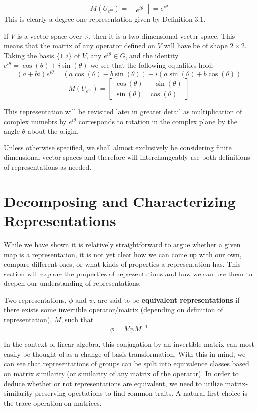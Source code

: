 $$M(U_{e^{i\theta}}) = \begin{bmatrix}
					e^{i\theta}
				\end{bmatrix} = e^{i\theta} $$
This is clearly a degree one representation given by Definition 3.1.

If $V$ is a vector space over $\mathbb{R}$, then it is a two-dimensional vector space. This means that the matrix of any operator defined on $V$ will have be of shape $2\times2$. Taking the basis $\{1,i\}$ of $V$, any $e^{i\theta} \in G$, and the identity $e^{i\theta} = \cos(\theta) + i\sin(\theta)$ we see that the following equalities hold:
$$(a+bi)e^{i\theta} = (a\cos(\theta)-b\sin(\theta))+i(a\sin(\theta)+b\cos(\theta))$$
$$M(U_{e^{i\theta}}) = \begin{bmatrix}
					\cos(\theta) & -\sin(\theta) \\
                                        \sin(\theta) & \cos(\theta)
				\end{bmatrix}$$

This representation will be revisited later in greater detail as multiplication of complex numebrs by $e^{i\theta}$ corresponds to rotation in the complex plane by the angle $\theta$ about the origin.

Unless otherwise specified, we shall almost exclusively be considering finite dimensional vector spaces and therefore will interchangeably use both definitions of representations as needed.

\section{Decomposing and Characterizing Representations}

While we have shown it is relatively straightforward to argue whether a given map is a representation, it is not yet clear how we can come up with our own, compare different ones, or what kinds of properties a representation has. This section will explore the properties of representations and how we can use them to deepen our understanding of representations.

\begin{definition}
	Two representations, $\phi$ and $\psi$, are said to be \textbf{equivalent representations} if there exists some invertible operator/matrix (depending on definition of representation), $M$, such that $$\phi = M \psi M^{-1}$$
\end{definition}

In the context of linear algebra, this conjugation by an invertible matrix can most easily be thought of as a change of basis transformation. With this in mind, we can see that representations of groups can be spilt into equivalence classes based on matrix similarity (or similarity of any matrix of the operator). In order to deduce whether or not representations are equivalent, we need to utilize matrix-similarity-preserving opertations to find common traits. A natural first choice is the trace operation on matrices.

